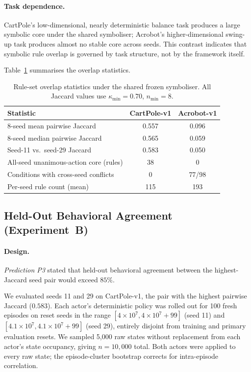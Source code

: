 \documentclass[12pt]{article}
\begin{document}
\paragraph{Task dependence.}
CartPole's low-dimensional, nearly deterministic balance task produces a
large symbolic core under the shared symboliser; Acrobot's higher-dimensional
swing-up task produces almost no stable core across seeds.
This contrast indicates that symbolic rule overlap is governed by task
structure, not by the framework itself.

Table~\ref{tab:overlap} summarises the overlap statistics.

\begin{table}[t]
\centering
\caption{Rule-set overlap statistics under the shared frozen symboliser.
  All Jaccard values use $\kappa_{\min}=0.70$, $n_{\min}=8$.}
\label{tab:overlap}
\begin{tabular}{lcc}
\toprule
Statistic & CartPole-v1 & Acrobot-v1 \\
\midrule
8-seed mean pairwise Jaccard          & 0.557 & 0.096 \\
8-seed median pairwise Jaccard        & 0.565 & 0.059 \\
Seed-11 vs.\ seed-29 Jaccard          & 0.583 & 0.050 \\
All-seed unanimous-action core (rules)& 38    & 0     \\
Conditions with cross-seed conflicts  & 0     & 77/98 \\
Per-seed rule count (mean)            & 115   & 193   \\
\bottomrule
\end{tabular}
\end{table}

\subsection{Held-Out Behavioral Agreement (Experiment~B)}
\label{sec:results:exptB}

\paragraph{Design.}
\emph{Prediction P3} stated that held-out behavioral agreement between
the highest-Jaccard seed pair would exceed $85\%$.

We evaluated seeds 11 and 29 on CartPole-v1, the pair with the highest
pairwise Jaccard ($0.583$).
Each actor's deterministic policy was rolled out for 100 fresh episodes
on reset seeds in the range $[4\times10^7, 4\times10^7+99]$ (seed 11)
and $[4.1\times10^7, 4.1\times10^7+99]$ (seed 29), entirely disjoint from
training and primary evaluation resets.
We sampled 5{,}000 raw states without replacement from each actor's
state occupancy, giving $n = 10{,}000$ total.
Both actors were applied to every raw state; the episode-cluster bootstrap
corrects for intra-episode correlation.
\end{document}
